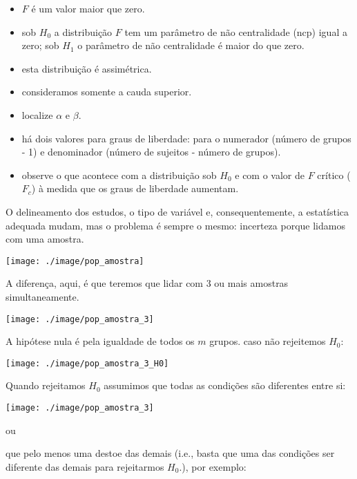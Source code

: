 \documentclass[]{article}
\providecommand{\tightlist}{%
  \setlength{\itemsep}{0pt}\setlength{\parskip}{0pt}}
\begin{document}
\begin{itemize}
\tightlist
\item
  \(F\) é um valor maior que zero.
\item
  sob \(H_0\) a distribuição \(F\) tem um parâmetro de não centralidade
  (ncp) igual a zero; sob \(H_1\) o parâmetro de não centralidade é
  maior do que zero.
\item
  esta distribuição é assimétrica.
\item
  consideramos somente a cauda superior.
\item
  localize \(\alpha\) e \(\beta\).
\item
  há dois valores para graus de liberdade: para o numerador (número de
  grupos - 1) e denominador (número de sujeitos - número de grupos).
\item
  observe o que acontece com a distribuição sob \(H_0\) e com o valor de
  \(F\) crítico (\(F_c\)) à medida que os graus de liberdade aumentam.
\end{itemize}

O delineamento dos estudos, o tipo de variável e, consequentemente, a
estatística adequada mudam, mas o problema é sempre o mesmo: incerteza
porque lidamos com uma amostra.

\begin{center}\texttt{[image: ./image/pop\_amostra]} \end{center}

A diferença, aqui, é que teremos que lidar com 3 ou mais amostras
simultaneamente.

\begin{center}\texttt{[image: ./image/pop\_amostra\_3]} \end{center}

A hipótese nula é pela igualdade de todos os \(m\) grupos. caso não
rejeitemos \(H_0\):

\begin{center}\texttt{[image: ./image/pop\_amostra\_3\_H0]} \end{center}

Quando rejeitamos \(H_0\) assumimos que todas as condições são
diferentes entre si:

\begin{center}\texttt{[image: ./image/pop\_amostra\_3]} \end{center}

ou

que pelo menos uma destoe das demais (i.e., basta que uma das condições
ser diferente das demais para rejeitarmos \(H_0\).), por exemplo:
\end{document}

